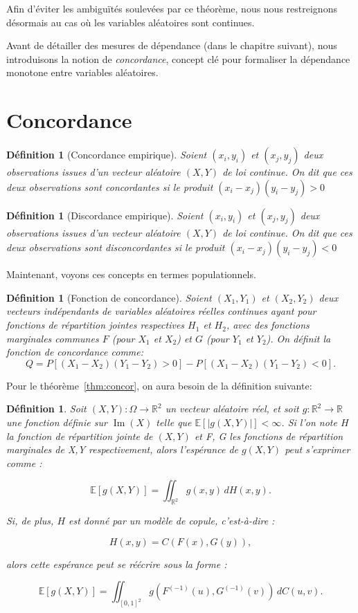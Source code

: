 \documentclass[a4paper,11pt]{amsbook}
\numberwithin{equation}{chapter}
\newtheorem{definition}	[theoreme]   {Définition}
\theoremstyle{definition}
\begin{document}
Afin d’éviter les ambiguïtés soulevées par ce théorème, nous nous restreignons désormais au cas où les variables aléatoires sont continues.

Avant de détailler des mesures de dépendance (dans le chapitre suivant), nous introduisons la notion de \emph{concordance}, concept clé pour formaliser la dépendance monotone entre variables aléatoires.

\section{Concordance}

\begin{definition}[Concordance empirique]
Soient $(x_i, y_i)$ et $(x_j, y_j)$ deux observations issues d’un vecteur aléatoire $(X, Y)$ de loi continue. On dit que ces deux observations sont \emph{concordantes} si le produit $(x_i - x_j)(y_i - y_j)>0$ 
\end{definition}

\begin{definition}[Discordance empirique]
Soient $(x_i, y_i)$ et $(x_j, y_j)$ deux observations issues d’un vecteur aléatoire $(X, Y)$ de loi continue. On dit que ces deux observations sont \emph{disconcordantes} si le produit $(x_i - x_j)(y_i - y_j)<0$ 
\end{definition}


Maintenant, voyons ces concepts en termes populationnels.
\begin{definition}[Fonction de concordance]\label{def:concor}
Soient $(X_1, Y_1)$ et $(X_2, Y_2)$ deux vecteurs indépendants de variables aléatoires réelles continues ayant pour fonctions de répartition jointes respectives $H_1$ et $H_2$, avec des fonctions marginales communes $F$ (pour $X_1$ et $X_2$) et $G$ (pour $Y_1$ et $Y_2$). On définit la fonction de concordance comme:
\[
Q = P\left[(X_1 - X_2)(Y_1 - Y_2) > 0 \right] - P\left[(X_1 - X_2)(Y_1 - Y_2) < 0 \right].
\]
\end{definition}

Pour le théorème~\ref{thm:concor}, on aura besoin de la définition suivante:

\begin{definition}\label{def:esperance}
Soit \( (X, Y) : \Omega \to \mathbb{R}^2 \) un vecteur aléatoire réel, et soit \( g : \mathbb{R}^2 \to \mathbb{R} \) une fonction définie sur \(\operatorname{Im}(X)\) telle que \( \mathbb{E}[|g(X,Y)|] < \infty \).  
Si l'on note \( H \) la fonction de répartition jointe de \( (X,Y) \) et F, G les fonctions de répartition marginales de X,Y respectivement, alors l'espérance de \( g(X, Y) \) peut s'exprimer comme :

\[
\mathbb{E} \left[ g(X, Y) \right] = \iint_{\mathbb{R}^{2}} g(x, y) \, dH(x, y).
\]

Si, de plus, \( H \) est donné par un modèle de copule, c'est-à-dire :

\[
H(x, y) = C(F(x), G(y)),
\]

alors cette espérance peut se réécrire sous la forme :

\[
\mathbb{E} \left[ g(X, Y) \right] = \iint_{[0,1]^{2}} g(F^{(-1)}(u), G^{(-1)}(v)) \, dC(u, v).
\]
\end{definition}
\end{document}
